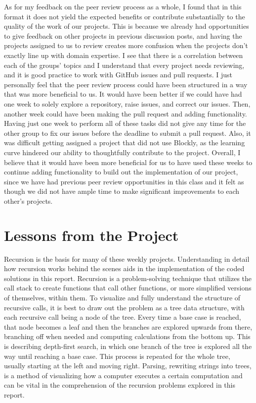 \documentclass{article}
\theoremstyle{theorem}
\theoremstyle{definition}
\theoremstyle{remark}
\begin{document}
As for my feedback on the peer review process as a whole, I found that in this format it does not yield the expected benefits or contribute substantially to the quality of the work of our projects. This is because we already had opportunities to give feedback on other projects in previous discussion posts, and having the projects assigned to us to review creates more confusion when the projects don't exactly line up with domain expertise. I see that there is a correlation between each of the groups' topics and I understand that every project needs reviewing, and it is good practice to work with GitHub issues and pull requests. I just personally feel that the peer review process could have been structured in a way that was more beneficial to us. It would have been better if we could have had one week to solely explore a repository, raise issues, and correct our issues. Then, another week could have been making the pull request and adding functionality. Having just one week to perform all of these tasks did not give any time for the other group to fix our issues before the deadline to submit a pull request. Also, it was difficult getting assigned a project that did not use Blockly, as the learning curve hindered our ability to thoughtfully contribute to the project. Overall, I believe that it would have been more beneficial for us to have used these weeks to continue adding functionality to build out the implementation of our project, since we have had previous peer review opportunities in this class and it felt as though we did not have ample time to make significant improvements to each other's projects. 

\section{Lessons from the Project}

Recursion is the basis for many of these weekly projects. Understanding in detail how recursion works behind the scenes aids in the implementation of the coded solutions in this report. Recursion is a problem-solving technique that utilizes the call stack to create functions that call other functions, or more simplified versions of themselves, within them. To visualize and fully understand the structure of recursive calls, it is best to draw out the problem as a tree data structure, with each recursive call being a node of the tree. Every time a base case is reached, that node becomes a leaf and then the branches are explored upwards from there, branching off when needed and computing calculations from the bottom up. This is describing depth-first search, in which one branch of the tree is explored all the way until reaching a base case. This process is repeated for the whole tree, usually starting at the left and moving right. Parsing, rewriting strings into trees, is a method of visualizing how a computer executes a certain computation and can be vital in the comprehension of the recursion problems explored in this report. 
\end{document}
